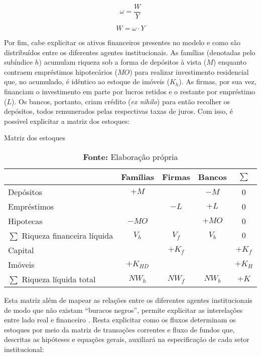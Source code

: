 $$
\omega = \frac{W}{Y}
$$

\begin{equation}
\label{_W}
    W = \omega\cdot Y
\end{equation}

Por fim, cabe explicitar os ativos financeiros presentes no modelo e como são distribuídos entre os diferentes agentes institucionais. As famílias (denotadas pelo subíndice $h$) acumulam riqueza sob a forma de depósitos à vista ($M$) enquanto contraem empréstimos hipotecários ($MO$) para realizar investimento residencial que, no acumulado, é idêntico ao estoque de imóveis ($K_h$). As firmas, por sua vez, financiam o investimento em parte por lucros retidos e o restante por empréstimo ($L$). Os bancos, portanto, criam crédito (\textit{ex nihilo}) para então recolher os depósitos, todos remunerados pelas respectivas taxas de juros. Com isso, é possivel explicitar a matriz dos estoques:


\begin{table}[H]
\centering
\caption{Matriz dos estoques}
\begin{tabular}{lcccc}
\hline
\hline


                          & Famílias      & Firmas        & Bancos  &    $\sum$ \\ \hline

Depósitos & $+M$ & & $-M$ & 0\\
Empréstimos & &$-L$& $+L$ & 0\\
Hipotecas &$-MO$&  & $+MO$ & 0\\\hline
$\sum$ Riqueza financeira líquida &$V_h$&$V_f$&$V_b$& $0$\\\hline
Capital & &$+K_f$&  & $+K_f$\\
Imóveis &$+K_{HD}$& &   & $+K_{H}$\\\hline
$\sum$ Riqueza líquida total&$NW_h$&$NW_f$&$NW_b$& $+K$\\
\hline
\hline
\end{tabular}%
\caption*{\textbf{Fonte:} Elaboração própria}
\end{table}

Esta matriz além de mapear as relações entre os diferentes agentes institucionais de modo que não existam ``buracos negros'', permite explicitar as interelações entre lado real e financeiro \cite{dos_santos_revisiting_2010}. Resta explicitar como os fluxos determinam os estoques por meio da matriz de transações correntes e fluxo de fundos que, descritas as hipóteses e equações gerais, auxiliará na especificação de cada setor institucional:

